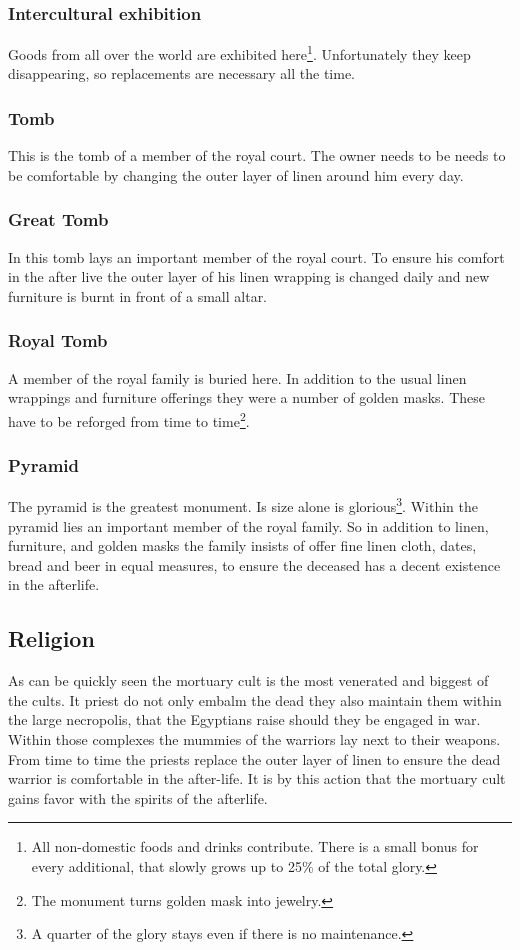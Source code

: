 \documentclass[a4paper]{book}
\begin{document}
\subsubsection{Intercultural exhibition}
Goods from all over the world are exhibited here\footnote{ All non-domestic
	foods and drinks contribute. There is a small bonus for every additional, that
	slowly grows up to 25\% of the total glory. }. Unfortunately they keep
disappearing, so replacements are necessary all the time.

\subsubsection{Tomb}
This is the tomb of a member of the royal court. The owner needs to be needs to
be comfortable by changing the outer layer of linen around him every day.

\subsubsection{Great Tomb}
In this tomb lays an important member of the royal court. To ensure his comfort
in the after live the outer layer of his linen wrapping is changed daily and
new furniture is burnt in front of a small altar.

\subsubsection{Royal Tomb}
A member of the royal family is buried here. In addition to the usual linen
wrappings and furniture offerings they were a number of golden masks. These
have to be reforged from time to time\footnote{ The monument turns golden mask
	into jewelry. }.

\subsubsection{Pyramid}
The pyramid is the greatest monument. Is size alone is glorious\footnote{ A
	quarter of the glory stays even if there is no maintenance. }. Within the
pyramid lies an important member of the royal family. So in addition to linen,
furniture, and golden masks the family insists of offer fine linen cloth,
dates, bread and beer in equal measures, to ensure the deceased has a decent
existence in the afterlife.

\subsection{Religion}
As can be quickly seen the mortuary cult is the most venerated and biggest of
the cults. It priest do not only embalm the dead they also maintain them within
the large necropolis, that the \gls{Egyptians} raise should they be engaged in
war. Within those complexes the mummies of the warriors lay next to their
weapons. From time to time the priests replace the outer layer of linen to
ensure the dead warrior is comfortable in the after-life. It is by this action
that the mortuary cult gains favor with the spirits of the afterlife.
\end{document}
